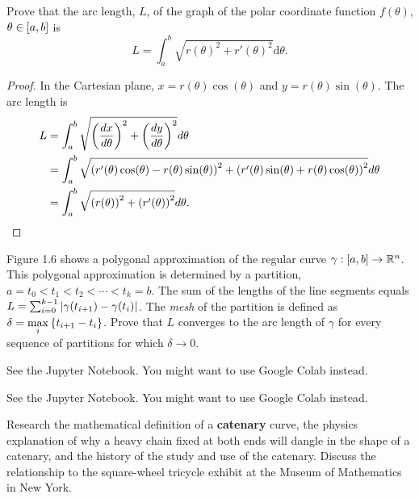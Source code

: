 \begin{exercise}{1.10}
	Prove that the arc length, $L$, of the graph of the polar coordinate function $f(\theta)$, $\theta \in \left[{a, b}\right]$ is
	\begin{equation*}
		L = \int^{b}_{a}\sqrt{{r(\theta)}^{2} + {r'(\theta)}^{2}}\mathrm{d}\theta.
	\end{equation*}
\end{exercise}

\begin{proof}
	In the Cartesian plane, $x = r(\theta)\cos(\theta)$ and $y = r(\theta)\sin(\theta)$. The arc length is
	\begin{align*}
		L & = \int^{b}_{a}\sqrt{\left({\frac{dx}{d\theta}}\right)^{2} + \left({\frac{dy}{d\theta}}\right)^{2}}d\theta                                                         \\
		  & = \int^{b}_{a}\sqrt{\left({r'(\theta)\cos(\theta) - r(\theta)\sin(\theta)}\right)^{2} + \left({r'(\theta)\sin(\theta) + r(\theta)\cos(\theta)}\right)^{2}}d\theta \\
		  & = \int^{b}_{a}\sqrt{\left({r(\theta)}\right)^{2} + \left({r'(\theta)}\right)^{2}}d\theta.\qedhere
	\end{align*}
\end{proof}

\begin{exercise}{1.11}
	Figure 1.6 shows a polygonal approximation of the regular curve $\gamma: \left[{a, b}\right]\to \mathbb{R}^{n}$.  This polygonal approximation is determined by a partition, $a = t_{0} < t_{1} < t_{2} < \cdots < t_{k} = b$. The sum of the lengths of the line segments equals $L = \sum^{k-1}_{i=0}\left\vert{\gamma(t_{i+1}) - \gamma(t_{i})}\right\vert$. The \textit{mesh} of the partition is defined as $\delta = \max\limits_{i}\left\{{t_{i+1} - t_{i}}\right\}$. Prove that $L$ converges to the arc length of $\gamma$ for every sequence of partitions for which $\delta\to 0$.
\end{exercise}

\begin{exercise}{1.12}
	See the Jupyter Notebook. You might want to use Google Colab instead.
\end{exercise}

\begin{exercise}{1.13}
	See the Jupyter Notebook. You might want to use Google Colab instead.
\end{exercise}

\begin{exercise}{1.14}
	Research the mathematical definition of a \textbf{catenary} curve, the physics explanation of why a heavy chain fixed at both ends will dangle in the shape of a catenary, and the history of the study and use of the catenary. Discuss the relationship to the square-wheel tricycle exhibit at the Museum of Mathematics in New York.
\end{exercise}

